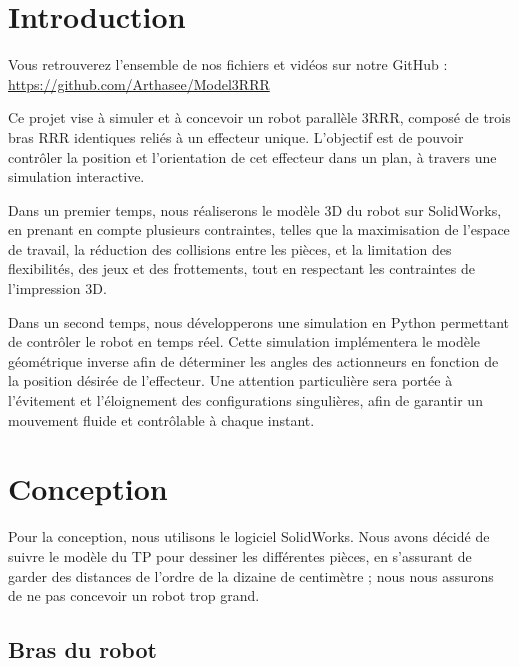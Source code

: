 \documentclass[a4paper, 11pt]{report}
\begin{document}

\clearpage\setcounter{page}{2}

\tableofcontents

\section*{Introduction}

Vous retrouverez l'ensemble de nos fichiers et vidéos sur notre GitHub : \url{https://github.com/Arthasee/Model3RRR}

Ce projet vise à simuler et à concevoir un robot parallèle 3RRR, composé de trois bras RRR identiques reliés à un effecteur unique. L'objectif est de pouvoir contrôler la position et l'orientation de cet effecteur dans un plan, à travers une simulation interactive.

Dans un premier temps, nous réaliserons le modèle 3D du robot sur SolidWorks, en prenant en compte plusieurs contraintes, telles que la maximisation de l'espace de travail, la réduction des collisions entre les pièces, et la limitation des flexibilités, des jeux et des frottements, tout en respectant les contraintes de l'impression 3D.

Dans un second temps, nous développerons une simulation en Python permettant de contrôler le robot en temps réel. Cette simulation implémentera le modèle géométrique inverse afin de déterminer les angles des actionneurs en fonction de la position désirée de l'effecteur. Une attention particulière sera portée à l'évitement et l'éloignement des configurations singulières, afin de garantir un mouvement fluide et contrôlable à chaque instant.

\section{Conception}

Pour la conception, nous utilisons le logiciel SolidWorks. Nous avons décidé de suivre le modèle du TP pour dessiner les différentes pièces, 
en s'assurant de garder des distances de l'ordre de la dizaine de centimètre ; nous nous assurons de ne pas concevoir un robot trop grand.

\subsection{Bras du robot}
\end{document}
